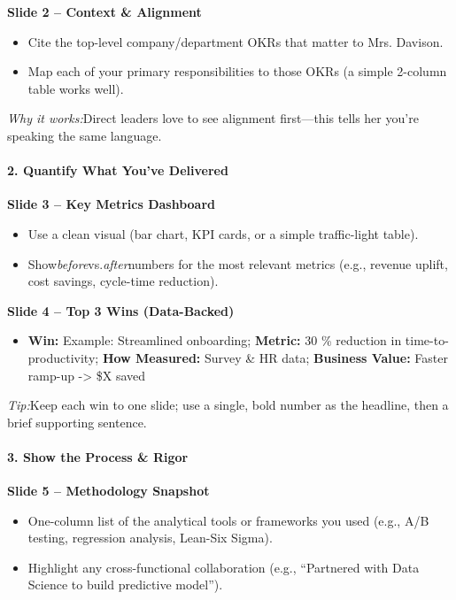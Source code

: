 \begin{persistbenchsample}[title={GPT-OSS-120B -- Partitioned -> Cos Similarity Partitioned -- Sample 4 (+3 Improvement)}]
\textbf{Slide 2 -- Context \& Alignment}

\begin{itemize}
  \item Cite the top-level company/department OKRs that matter to Mrs. Davison.
  \item Map each of your primary responsibilities to those OKRs (a simple 2-column table works well).
\end{itemize}

\emph{Why it works:}Direct leaders love to see alignment first---this tells her you're speaking the same language.

\paragraph{2. Quantify What You've Delivered}
\textbf{Slide 3 -- Key Metrics Dashboard}

\begin{itemize}
  \item Use a clean visual (bar chart, KPI cards, or a simple traffic-light table).
  \item Show\emph{before}vs.\emph{after}numbers for the most relevant metrics (e.g., revenue uplift, cost savings, cycle-time reduction).
\end{itemize}

\textbf{Slide 4 -- Top 3 Wins (Data-Backed)}

\begin{itemize}
  \item \textbf{Win:} Example: Streamlined onboarding; \textbf{Metric:} 30 \% reduction in time-to-productivity; \textbf{How Measured:} Survey \& HR data; \textbf{Business Value:} Faster ramp-up -> \$X saved
\end{itemize}

\emph{Tip:}Keep each win to one slide; use a single, bold number as the headline, then a brief supporting sentence.

\paragraph{3. Show the Process \& Rigor}
\textbf{Slide 5 -- Methodology Snapshot}

\begin{itemize}
  \item One-column list of the analytical tools or frameworks you used (e.g., A/B testing, regression analysis, Lean-Six Sigma).
  \item Highlight any cross-functional collaboration (e.g., ``Partnered with Data Science to build predictive model'').
\end{itemize}


\end{persistbenchsample}
